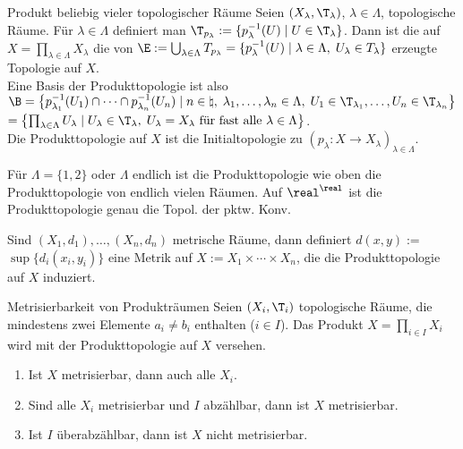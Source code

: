 \begin{Def}{Produkt beliebig vieler topologischer Räume}
    Seien $(X_\lambda, \T_\lambda)$, $\lambda \in \Lambda$, topologische Räume.
    Für $\lambda \in \Lambda$ definiert man
    $\T_{p_\lambda} := \{p_\lambda^{-1}(U) \;|\; U \in \T_\lambda\}$.
    Dann ist die  auf
    $X = \prod_{\lambda \in \Lambda} X_\lambda$ die von
    $\E := \bigcup_{\lambda \in \Lambda} T_{p_\lambda} =
    \{p_\lambda^{-1}(U) \;|\; \lambda \in \Lambda,\; U_\lambda \in T_\lambda\}$
    erzeugte Topologie auf $X$. \\
    Eine Basis der Produkttopologie ist also \\
    $\B = \left\{p_{\lambda_1}^{-1}(U_1) \cap \dotsb \cap
    p_{\lambda_n}^{-1}(U_n) \;|\; n \in \natural,\;
    \lambda_1, \dotsc, \lambda_n \in \Lambda,\;
    U_1 \in \T_{\lambda_1}, \dotsc, U_n \in \T_{\lambda_n}\right\}$ \\
    $= \left\{\prod_{\lambda \in \Lambda} U_\lambda \;|\;
    U_\lambda \in \T_\lambda,\;
    U_\lambda = X_\lambda \text{ für fast alle }
    \lambda \in \Lambda\right\}$. \\
    Die Produkttopologie auf $X$ ist die Initialtopologie zu
    $(p_\lambda\colon X \rightarrow X_\lambda)_{\lambda \in \Lambda}$.
\end{Def}

\begin{Bsp}
    Für $\Lambda = \{1, 2\}$ oder $\Lambda$ endlich ist die Produkttopologie
    wie oben die Produkttopologie von endlich vielen Räumen.
    Auf $\real^\real$ ist die Produkttopologie genau die Topol. der
    pktw. Konv.
\end{Bsp}

\linie

\begin{Bem}
    Sind $(X_1, d_1), \dotsc, (X_n, d_n)$ metrische Räume, dann definiert
    $d(x, y) :=$ \\
    $\sup\{d_i(x_i, y_i)\}$
    eine Metrik auf $X := X_1 \times \dotsb \times X_n$, die die
    Produkttopologie auf $X$ induziert.
\end{Bem}

\begin{Satz}{Metrisierbarkeit von Produkträumen}
    Seien $(X_i, \T_i)$ topologische Räume, die mindestens zwei Elemente
    $a_i \not= b_i$ enthalten ($i \in I$).
    Das Produkt $X = \prod_{i \in I} X_i$ wird mit der Produkttopologie
    auf $X$ versehen.
    \begin{enumerate}
        \item
        Ist $X$ metrisierbar, dann auch alle $X_i$.

        \item
        Sind alle $X_i$ metrisierbar und $I$ abzählbar, dann ist $X$
        metrisierbar.

        \item
        Ist $I$ überabzählbar, dann ist $X$ nicht metrisierbar.
    \end{enumerate}
\end{Satz}

